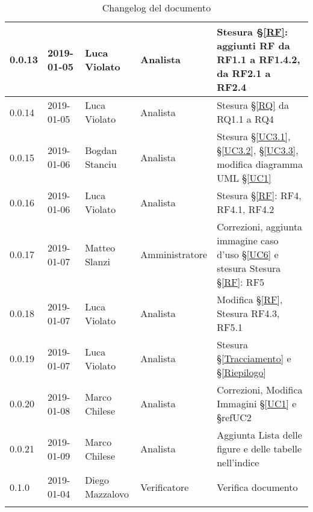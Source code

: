 \begin{center}
\begin{longtable}[c]{|m{}|m{}|m{}|m{}|p{}|}
\hline
0.0.13 & 2019-01-05 & Luca Violato & Analista & Stesura §\ref{RF}: aggiunti RF da RF1.1 a RF1.4.2, da RF2.1 a RF2.4\\
\hline
\rowcolor{grigio}0.0.14 & 2019-01-05 & Luca Violato & Analista & Stesura §\ref{RQ} da RQ1.1 a RQ4\\
\hline
0.0.15 & 2019-01-06 & Bogdan Stanciu & Analista & Stesura §\ref{UC3.1}, §\ref{UC3.2}, §\ref{UC3.3}, modifica diagramma UML §\ref{UC1} \\
\hline
\rowcolor{grigio}0.0.16 & 2019-01-06 & Luca Violato & Analista & Stesura §\ref{RF}: RF4, RF4.1, RF4.2\\
\hline
0.0.17 & 2019-01-07 & Matteo Slanzi & Amministratore & Correzioni, aggiunta immagine caso d'uso §\ref{UC6} e
stesura Stesura §\ref{RF}: RF5\\
\hline
\rowcolor{grigio}0.0.18 & 2019-01-07 & Luca Violato & Analista & Modifica §\ref{RF}, Stesura RF4.3, RF5.1\\
\hline
0.0.19 & 2019-01-07 & Luca Violato & Analista & Stesura §\ref{Tracciamento} e §\ref{Riepilogo}\\
\hline
\rowcolor{grigio}0.0.20 & 2019-01-08 & Marco Chilese & Analista & Correzioni, Modifica Immagini §\ref{UC1} e §ref{UC2}\\
\hline
0.0.21 & 2019-01-09 & Marco Chilese & Analista & Aggiunta Lista delle figure e delle tabelle nell'indice\\
\hline
0.1.0 & 2019-01-04 & Diego Mazzalovo & Verificatore & Verifica documento\\
\hline
\caption{Changelog del documento}
\end{longtable}
\end{center}